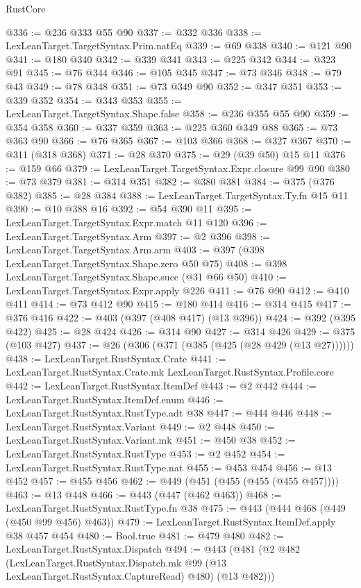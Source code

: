 \begin{lexlean}{RustCore}
\begin{coremodule}
@336 := @236 @333 @55 @90
@337 := @332 @336
@338 := LexLeanTarget.TargetSyntax.Prim.natEq
@339 := @69 @338
@340 := @121 @90
@341 := @180 @340
@342 := @339 @341
@343 := @225 @342
@344 := @323 @91
@345 := @76 @344
@346 := @105 @345
@347 := @73 @346
@348 := @79 @43
@349 := @78 @348
@351 := @73 @349 @90
@352 := @347 @351
@353 := @339 @352
@354 := @343 @353
@355 := LexLeanTarget.TargetSyntax.Shape.false
@358 := @236 @355 @55 @90
@359 := @354 @358
@360 := @337 @359
@363 := @225 @360 @349 @88
@365 := @73 @363 @90
@366 := @76 @365
@367 := @103 @366
@368 := @327 @367
@370 := @311 (@318 @368)
@371 := @28 @370
@375 := @29 (@39 @50) @15 @11
@376 := @159 @66
@379 := LexLeanTarget.TargetSyntax.Expr.closure @99 @90
@380 := @73 @379
@381 := @314 @351
@382 := @380 @381
@384 := @375 (@376 @382)
@385 := @28 @384
@388 := LexLeanTarget.TargetSyntax.Ty.fn @15 @11
@390 := @10 @388 @16
@392 := @54 @390 @11
@395 := LexLeanTarget.TargetSyntax.Expr.match @11 @120
@396 := LexLeanTarget.TargetSyntax.Arm
@397 := @2 @396
@398 := LexLeanTarget.TargetSyntax.Arm.arm
@403 := @397 (@398 LexLeanTarget.TargetSyntax.Shape.zero @50 @75)
@408 := @398 LexLeanTarget.TargetSyntax.Shape.succ (@31 @66 @50)
@410 := LexLeanTarget.TargetSyntax.Expr.apply @226
@411 := @76 @90
@412 := @410 @411
@414 := @73 @412 @90
@415 := @180 @414
@416 := @314 @415
@417 := @376 @416
@422 := @403 (@397 (@408 @417) (@13 @396))
@424 := @392 (@395 @422)
@425 := @28 @424
@426 := @314 @90
@427 := @314 @426
@429 := @375 (@103 @427)
@437 := @26 (@306 (@371 (@385 (@425 (@28 @429 (@13 @27))))))
@438 := LexLeanTarget.RustSyntax.Crate
@441 := LexLeanTarget.RustSyntax.Crate.mk LexLeanTarget.RustSyntax.Profile.core
@442 := LexLeanTarget.RustSyntax.ItemDef
@443 := @2 @442
@444 := LexLeanTarget.RustSyntax.ItemDef.enum
@446 := LexLeanTarget.RustSyntax.RustType.adt @38
@447 := @444 @446
@448 := LexLeanTarget.RustSyntax.Variant
@449 := @2 @448
@450 := LexLeanTarget.RustSyntax.Variant.mk
@451 := @450 @38
@452 := LexLeanTarget.RustSyntax.RustType
@453 := @2 @452
@454 := LexLeanTarget.RustSyntax.RustType.nat
@455 := @453 @454
@456 := @13 @452
@457 := @455 @456
@462 := @449 (@451 (@455 (@455 (@455 @457))))
@463 := @13 @448
@466 := @443 (@447 (@462 @463))
@468 := LexLeanTarget.RustSyntax.RustType.fn @38
@475 := @443 (@444 @468 (@449 (@450 @99 @456) @463))
@479 := LexLeanTarget.RustSyntax.ItemDef.apply @38 @457 @454
@480 := Bool.true
@481 := @479 @480
@482 := LexLeanTarget.RustSyntax.Dispatch
@494 := @443
    (@481
      (@2
        @482
        (LexLeanTarget.RustSyntax.Dispatch.mk @99 (@13 LexLeanTarget.RustSyntax.CaptureRead) @480)
        (@13 @482)))

\end{coremodule}
\end{lexlean}
